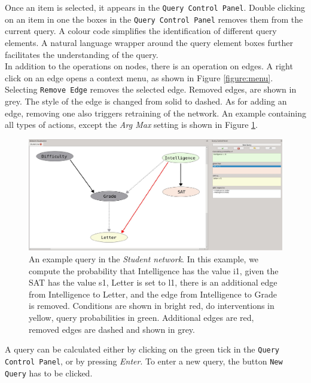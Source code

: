 Once an item is selected, it appears in the \texttt{Query Control Panel}. Double clicking on an item in one the boxes in the \texttt{Query Control Panel} removes them from the current query.
A colour code simplifies the identification of different query elements. A natural language wrapper around the query element boxes further facilitates the understanding of the query.
\bigskip
\\In addition to the operations on nodes, there is an operation on edges. A right click on an edge opens a context menu, as shown in Figure \ref{figure:menu}. Selecting \texttt{Remove Edge} removes the selected edge.
Removed edges, are shown in grey. The style of the edge is changed from solid to dashed. As for adding an edge, removing one also triggers retraining of the network.
An example containing all types of actions, except the \textit{Arg Max} setting is shown in Figure \ref{figure:exampleInteractive}.
\begin{figure}[H]
 \begin{center}
  \includegraphics[width=\textwidth]{pic/exampleAll.eps}
  \caption{An example query in the \textit{Student network}. In this example, we compute the probability that
  Intelligence has the value i1, given the SAT has the value s1, Letter is set to l1, there is an additional edge
  from Intelligence to Letter, and the edge from Intelligence to Grade is removed. 
  Conditions are shown in bright red, do interventions in yellow, query probabilities in green.
  Additional edges are red, removed edges are dashed and shown in grey.}
  \label{figure:exampleInteractive}
 \end{center}
\end{figure}
\noindent
A query can be calculated either by clicking on the green tick in the \texttt{Query Control Panel}, or by pressing \textit{Enter}.
To enter a new query, the button \texttt{New Query} has to be clicked.

